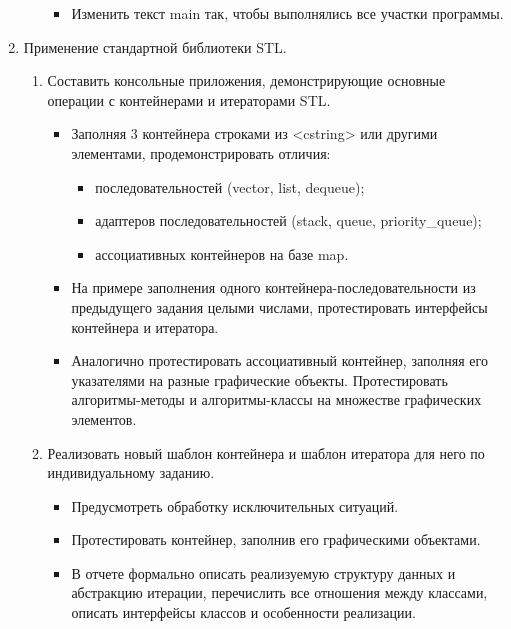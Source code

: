 \documentclass[a4paper, 14pt]{extarticle}
\begin{document}
\begin{enumerate}
\begin{enumerate}
\begin{itemize}
            \item Изменить текст main так, чтобы выполнялись все участки программы.
        \end{itemize}
    \end{enumerate}
    \item Применение стандартной библиотеки STL.\@
    \begin{enumerate}
        \item Составить консольные приложения, демонстрирующие основные операции с контейнерами и итераторами STL.\@
        \begin{itemize}
            \item Заполняя 3 контейнера строками из <cstring> или другими элементами, продемонстрировать отличия:
            \begin{itemize}
                \item последовательностей (vector, list, dequeue);
                \item адаптеров последовательностей (stack, queue, priority\_queue);
                \item ассоциативных контейнеров на базе map.
            \end{itemize}
            \item На примере заполнения одного контейнера-последовательности из предыдущего задания целыми числами, протестировать интерфейсы контейнера и итератора.
            \item Аналогично протестировать ассоциативный контейнер, заполняя его указателями на разные графические объекты. Протестировать алгоритмы-методы и алгоритмы-классы на множестве графических элементов.
        \end{itemize}
        \item Реализовать новый шаблон контейнера и шаблон итератора для него по индивидуальному заданию.
        \begin{itemize}
            \item Предусмотреть обработку исключительных ситуаций.
            \item Протестировать контейнер, заполнив его графическими объектами.
            \item В отчете формально описать реализуемую структуру данных и абстракцию итерации, перечислить все отношения между классами, описать интерфейсы классов и особенности реализации.
        \end{itemize}
    \end{enumerate}
\end{enumerate}
\end{document}
